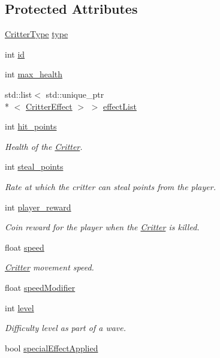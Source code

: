 \subsection*{Protected Attributes}
\begin{DoxyCompactItemize}
\item 
\hyperlink{class_critter_acda8a5c3234b66101e0546d75d6f90f1}{Critter\+Type} \hyperlink{class_critter_ac59fc8262aaffbdae6f2823460b58737}{type}
\item 
int \hyperlink{class_critter_ae775e0ebe6e8bbe249c403670bda46f8}{id}
\item 
int \hyperlink{class_critter_a9b2e317fb3a104ea9b449f77c81d7d7a}{max\+\_\+health}
\item 
std\+::list$<$ std\+::unique\+\_\+ptr\\*
$<$ \hyperlink{class_critter_effect}{Critter\+Effect} $>$ $>$ \hyperlink{class_critter_a9974fdc5dd5ef5afc8ff2fffbd2261e0}{effect\+List}
\item 
int \hyperlink{class_critter_a916038a11e8443ea403a644e91fc791e}{hit\+\_\+points}
\begin{DoxyCompactList}\small\item\em Health of the \hyperlink{class_critter}{Critter}. \end{DoxyCompactList}\item 
int \hyperlink{class_critter_ad2b5b3ee8a0b69d4023f60cfb9f26a6a}{steal\+\_\+points}
\begin{DoxyCompactList}\small\item\em Rate at which the critter can steal points from the player. \end{DoxyCompactList}\item 
int \hyperlink{class_critter_a2a17f7366fbde83714742e66ba3e63a7}{player\+\_\+reward}
\begin{DoxyCompactList}\small\item\em Coin reward for the player when the \hyperlink{class_critter}{Critter} is killed. \end{DoxyCompactList}\item 
float \hyperlink{class_critter_adde7d84a0dd9ac8f5dc144464928638f}{speed}
\begin{DoxyCompactList}\small\item\em \hyperlink{class_critter}{Critter} movement speed. \end{DoxyCompactList}\item 
float \hyperlink{class_critter_ad53189c28d3f392ea8d1f1796e7c0744}{speed\+Modifier}
\item 
int \hyperlink{class_critter_a9f9a6408a55212036f317710dc3da410}{level}
\begin{DoxyCompactList}\small\item\em Difficulty level as part of a wave. \end{DoxyCompactList}\item 
bool \hyperlink{class_critter_aa30e57414bd64c920dca286f87da5c3f}{special\+Effect\+Applied}
\end{DoxyCompactItemize}
